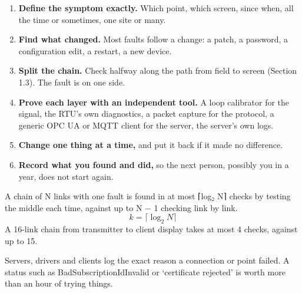 \begin{enumerate}
\item \textbf{Define the symptom exactly.} Which point, which screen, since when, all the time or sometimes, one site or many.
\item \textbf{Find what changed.} Most faults follow a change: a patch, a password, a configuration edit, a restart, a new device.
\item \textbf{Split the chain.} Check halfway along the path from field to screen (Section 1.3). The fault is on one side.
\item \textbf{Prove each layer with an independent tool.} A loop calibrator for the signal, the RTU's own diagnostics, a packet capture for the protocol, a generic OPC UA or MQTT client for the server, the server's own logs.
\item \textbf{Change one thing at a time,} and put it back if it made no difference.
\item \textbf{Record what you found and did,} so the next person, possibly you in a year, does not start again.
\end{enumerate}
 A chain of N links with one fault is found in at most ⌈log₂ N⌉ checks by testing the middle each time, against up to N − 1 checking link by link.
\[ k = \lceil \log_2 N \rceil \]
A 16-link chain from transmitter to client display takes at most 4 checks, against up to 15.

 Servers, drivers and clients log the exact reason a connection or point failed. A status such as BadSubscriptionIdInvalid or ‘certificate rejected’ is worth more than an hour of trying things.

